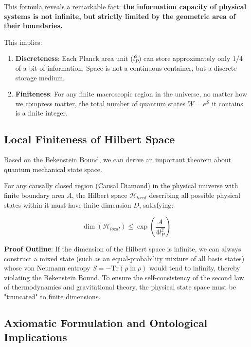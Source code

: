 This formula reveals a remarkable fact: \textbf{the information capacity of physical systems is not infinite, but strictly limited by the geometric area of their boundaries.}

This implies:

\begin{enumerate}
\item \textbf{Discreteness}: Each Planck area unit ($l_P^2$) can store approximately only 1/4 of a bit of information. Space is not a continuous container, but a discrete storage medium.

\item \textbf{Finiteness}: For any finite macroscopic region in the universe, no matter how we compress matter, the total number of quantum states $W = e^S$ it contains is a finite integer.
\end{enumerate}

\subsection{Local Finiteness of Hilbert Space}

Based on the Bekenstein Bound, we can derive an important theorem about quantum mechanical state space.

\begin{theorem}
For any causally closed region (Causal Diamond) in the physical universe with finite boundary area $A$, the Hilbert space $\mathcal{H}_{local}$ describing all possible physical states within it must have finite dimension $D$, satisfying:

\begin{equation}
\dim(\mathcal{H}_{local}) \le \exp\left(\frac{A}{4 l_P^2}\right)
\end{equation}
\end{theorem}

\textbf{Proof Outline}: If the dimension of the Hilbert space is infinite, we can always construct a mixed state (such as an equal-probability mixture of all basis states) whose von Neumann entropy $S = -\text{Tr}(\rho \ln \rho)$ would tend to infinity, thereby violating the Bekenstein Bound. To ensure the self-consistency of the second law of thermodynamics and gravitational theory, the physical state space must be "truncated" to finite dimensions.

\subsection{Axiomatic Formulation and Ontological Implications}


